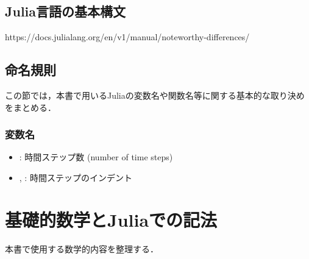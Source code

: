 \subsection{Julia言語の基本構文}
https://docs.julialang.org/en/v1/manual/noteworthy-differences/
\subsection{命名規則}
この節では，本書で用いるJuliaの変数名や関数名等に関する基本的な取り決めをまとめる．
\subsubsection{変数名}
\begin{itemize}
\item {}: 時間ステップ数 (number of time steps)
\item {}, : 時間ステップのインデント
\end{itemize}
\section{基礎的数学とJuliaでの記法}
本書で使用する数学的内容を整理する．
